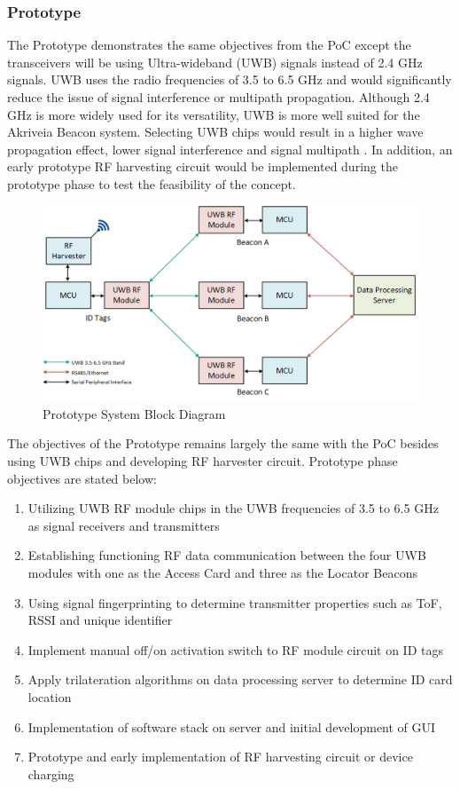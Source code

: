 \break
\subsubsection{Prototype}
The Prototype demonstrates the same objectives from the PoC except the transceivers will be using Ultra-wideband (UWB) signals instead of 2.4 GHz signals. UWB uses the radio frequencies of 3.5 to 6.5 GHz and would significantly reduce the issue of signal interference or multipath propagation. Although 2.4 GHz is more widely used for its versatility, UWB is more well suited for the Akriveia Beacon system. Selecting UWB chips would result in a higher wave propagation effect, lower signal interference and signal multipath \cite{R4}. In addition, an early prototype RF harvesting circuit would be implemented during the prototype phase to test the feasibility of the concept.

\begin{figure}[h!]
    \centering
    \includegraphics[width=\linewidth]{./images/02_sys_Prototype.png}
    \caption{Prototype System Block Diagram}
    \label{fig:prototype_sys_blk}
\end{figure}
\bigskip

The objectives of the Prototype remains largely the same with the PoC besides using UWB
chips and developing RF harvester circuit. Prototype phase objectives are stated below:

\begin{enumerate}
    \item Utilizing UWB RF module chips in the UWB frequencies of 3.5 to 6.5 GHz as
    signal receivers and transmitters
    \item Establishing functioning RF data communication between the four UWB modules
    with one as the Access Card and three as the Locator Beacons
    \item Using signal fingerprinting to determine transmitter properties such as ToF,
    RSSI and unique identifier
    \item Implement manual off/on activation switch to RF module circuit on ID tags
    \item Apply trilateration algorithms on data processing server to determine
    ID card location
    \item Implementation of software stack on server and initial development of GUI
    \item Prototype and early implementation of  RF harvesting circuit or device charging
\end{enumerate}


